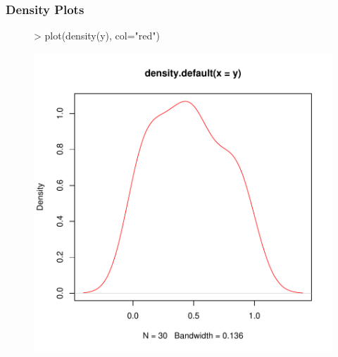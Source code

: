 \documentclass{beamer}
\begin{document}
\begin{frame}[containsverbatim]  
	\frametitle{Density Plots}
\scriptsize
\begin{figure}
  \centering
\begin{Schunk}
\begin{Sinput}
> plot(density(y), col="red")
\end{Sinput}
\end{Schunk}
\includegraphics{fig--018}
\label{fig:dens}
\end{figure}
\end{frame}
\end{document}
